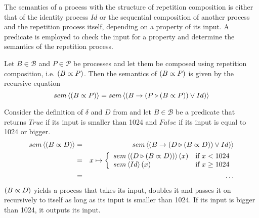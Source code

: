 The semantics of a process with the structure of repetition composition is either that of the identity process $Id$ or the sequential composition of another process and the repetition process itself, depending on a property of its input. A predicate is employed to check the input for a property and determine the semantics of the repetition process.
\begin{definition}
\label{def:sem_repetition}
Let $B \in \mathcal{B}$ and $P \in \mathcal{P}$ be processes and let them be composed using repetition composition, i.e. $\left( B \propto P \right)$. Then the semantics of $\left( B \propto P \right)$ is given by the recursive equation
  \begin{equation*}
    \label{eqn_sem_repetition}
    sem \left\langle \left( B \propto P \right) \right\rangle = sem \left\langle \left( B \to \left( P \triangleright \left( B \propto P \right) \right) \vee Id \right) \right\rangle
  \end{equation*}
  \hfill\qedsymbol
\end{definition}

\begin{example}
\label{exp:sem_repetition}
Consider the definition of $\delta$ and $D$ from  and let $B \in \mathcal{B}$ be a predicate that returns $True$ if its input is smaller than 1024 and $False$ if its input is equal to 1024 or bigger.
  \begin{eqnarray*}
    sem \left\langle \left( B \propto D \right) \right\rangle & = & sem \left\langle \left( B \to \left( D \triangleright \left( B \propto D \right) \right) \vee Id \right) \right\rangle \\
                            & = & x \mapsto \left\{ \begin{array}{ll} 
                                                      sem \left\langle \left( D \triangleright \left( B \propto D \right) \right) \right\rangle \left( x \right) & \text{if } x < 1024 \\
                                                      sem \left\langle Id \right\rangle \left( x \right)                              & \text{if } x \geq 1024 
                                                    \end{array}
                                            \right. \\
                            & = & \ldots
  \end{eqnarray*}
$\left( B \propto D \right)$ yields a process that takes its input, doubles it and passes it on recursively to itself as long as its input is smaller than 1024. If its input is bigger than 1024, it outputs its input.
\end{example}


